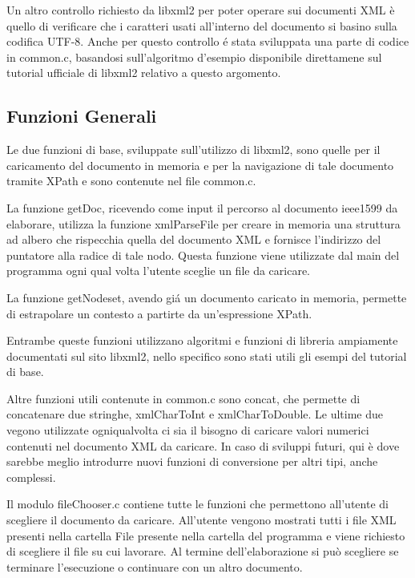 \documentclass[12pt,italian]{report}
\begin{document}
Un altro controllo richiesto da libxml2 per poter operare sui documenti XML \`e quello di verificare che i caratteri usati all'interno del documento si basino sulla codifica UTF-8. Anche per questo controllo \'e stata sviluppata una parte di codice in common.c, basandosi sull'algoritmo d'esempio disponibile direttamene sul tutorial ufficiale di libxml2 relativo a questo argomento.
 
\subsection{Funzioni Generali}
\label{subsec:funzionigenerali}

Le due funzioni di base, sviluppate sull'utilizzo di libxml2, sono quelle per il caricamento del documento in memoria e per la navigazione di tale documento tramite XPath e sono contenute nel file common.c.

La funzione getDoc, ricevendo come input il percorso al documento ieee1599 da elaborare, utilizza la funzione xmlParseFile per creare in memoria una struttura ad albero che rispecchia quella del documento XML e fornisce l'indirizzo del puntatore alla radice di tale nodo. Questa funzione viene utilizzate dal main del programma ogni qual volta l'utente sceglie un file da caricare.

La funzione getNodeset, avendo giá un documento caricato in memoria, permette di estrapolare un contesto a partirte da un'espressione XPath.

Entrambe queste funzioni utilizzano algoritmi e funzioni di libreria ampiamente documentati sul sito libxml2, nello specifico sono stati utili gli esempi del tutorial di base.


Altre funzioni utili contenute in common.c sono concat, che permette di concatenare due stringhe, xmlCharToInt e xmlCharToDouble. Le ultime due vegono utilizzate ogniqualvolta ci sia il bisogno di caricare valori numerici contenuti nel documento XML da caricare. In caso di sviluppi futuri, qui \`e dove sarebbe meglio introdurre nuovi funzioni di conversione per altri tipi, anche complessi.


Il modulo fileChooser.c contiene tutte le funzioni che permettono all'utente di scegliere il documento da caricare. All'utente vengono mostrati tutti i file XML presenti nella cartella File presente nella cartella del programma e viene richiesto di scegliere il file su cui lavorare. Al termine dell'elaborazione si pu\`o scegliere se terminare l'esecuzione o continuare con un altro documento.
\end{document}
